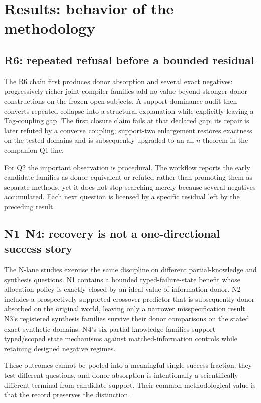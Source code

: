 \section{Results: behavior of the methodology}

\subsection{R6: repeated refusal before a bounded residual}
The R6 chain first produces donor absorption and several exact negatives: progressively richer joint compiler families add no value beyond stronger donor constructions on the frozen open subjects. A support-dominance audit then converts repeated collapse into a structural explanation while explicitly leaving a Tag-coupling gap. The first closure claim fails at that declared gap; its repair is later refuted by a converse coupling; support-two enlargement restores exactness on the tested domains and is subsequently upgraded to an all-$n$ theorem in the companion Q1 line.

For Q2 the important observation is procedural. The workflow reports the early candidate families as donor-equivalent or refuted rather than promoting them as separate methods, yet it does not stop searching merely because several negatives accumulated. Each next question is licensed by a specific residual left by the preceding result.

\subsection{N1--N4: recovery is not a one-directional success story}
The N-lane studies exercise the same discipline on different partial-knowledge and synthesis questions. N1 contains a bounded typed-failure-state benefit whose allocation policy is exactly closed by an ideal value-of-information donor. N2 includes a prospectively supported crossover predictor that is subsequently donor-absorbed on the original world, leaving only a narrower misspecification result. N3's registered synthesis families survive their donor comparisons on the stated exact-synthetic domains. N4's six partial-knowledge families support typed/scoped state mechanisms against matched-information controls while retaining designed negative regimes.

These outcomes cannot be pooled into a meaningful single success fraction: they test different questions, and donor absorption is intentionally a scientifically different terminal from candidate support. Their common methodological value is that the record preserves the distinction.

